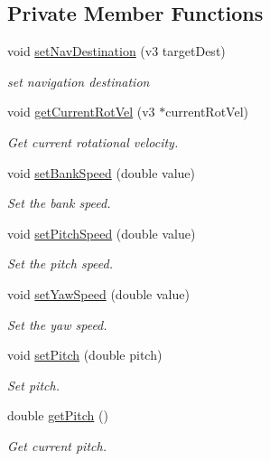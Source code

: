 \subsection*{Private Member Functions}
\begin{DoxyCompactItemize}
\item 
void \mbox{\hyperlink{classNavAP_a08d3e9dd6da93b1b8fdc8e4eb8db25f8}{set\+Nav\+Destination}} (v3 target\+Dest)
\begin{DoxyCompactList}\small\item\em set navigation destination \end{DoxyCompactList}\item 
void \mbox{\hyperlink{classNavAP_aa0e617c2a5b253b3eeaead6efc15b0a9}{get\+Current\+Rot\+Vel}} (v3 $\ast$current\+Rot\+Vel)
\begin{DoxyCompactList}\small\item\em Get current rotational velocity. \end{DoxyCompactList}\item 
void \mbox{\hyperlink{classNavAP_a95201f5107ae00ef860127d54db689f1}{set\+Bank\+Speed}} (double value)
\begin{DoxyCompactList}\small\item\em Set the bank speed. \end{DoxyCompactList}\item 
void \mbox{\hyperlink{classNavAP_ac2b12b7cb72789a30339672b658939c8}{set\+Pitch\+Speed}} (double value)
\begin{DoxyCompactList}\small\item\em Set the pitch speed. \end{DoxyCompactList}\item 
void \mbox{\hyperlink{classNavAP_acc70dd131f7601bf4b1dff866db44119}{set\+Yaw\+Speed}} (double value)
\begin{DoxyCompactList}\small\item\em Set the yaw speed. \end{DoxyCompactList}\item 
void \mbox{\hyperlink{classNavAP_a57ad1893baffb58fe05f3d6c7113dd7f}{set\+Pitch}} (double pitch)
\begin{DoxyCompactList}\small\item\em Set pitch. \end{DoxyCompactList}\item 
double \mbox{\hyperlink{classNavAP_a7fc8e4aae8a9b3475651637773955b6f}{get\+Pitch}} ()
\begin{DoxyCompactList}\small\item\em Get current pitch. \end{DoxyCompactList}\item 

\end{DoxyCompactItemize}
